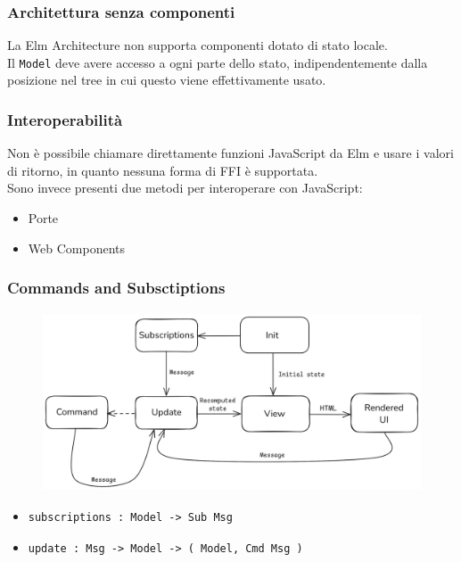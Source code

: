 \documentclass{beamer}
\begin{document}
\begin{frame}
  \frametitle{Architettura senza componenti}
  La Elm Architecture non supporta componenti dotato di stato locale.\\

  Il \texttt{Model} deve avere accesso a ogni parte dello stato, indipendentemente dalla posizione nel tree in cui questo viene effettivamente usato.
\end{frame}

\begin{frame}
  \frametitle{Interoperabilità}
  Non è possibile chiamare direttamente funzioni JavaScript da Elm e usare i valori di ritorno, in quanto nessuna forma di FFI è supportata.\\

  Sono invece presenti due metodi per interoperare con JavaScript:
  \vspace{3pt}
  \begin{itemize}
    \item Porte
    \item Web Components
  \end{itemize}

\end{frame}

\begin{frame}[containsverbatim]
  \frametitle{Commands and Subsctiptions}
  \begin{figure}
    \centering
    \includegraphics[height=150pt]{assets/elm-architecture-xt.png}
  \end{figure}
  \begin{itemize}
      \item\begin{verbatim}
subscriptions : Model -> Sub Msg
      \end{verbatim}
      \item\begin{verbatim}
update : Msg -> Model -> ( Model, Cmd Msg )
      \end{verbatim}
  \end{itemize}

\end{frame}
\end{document}
